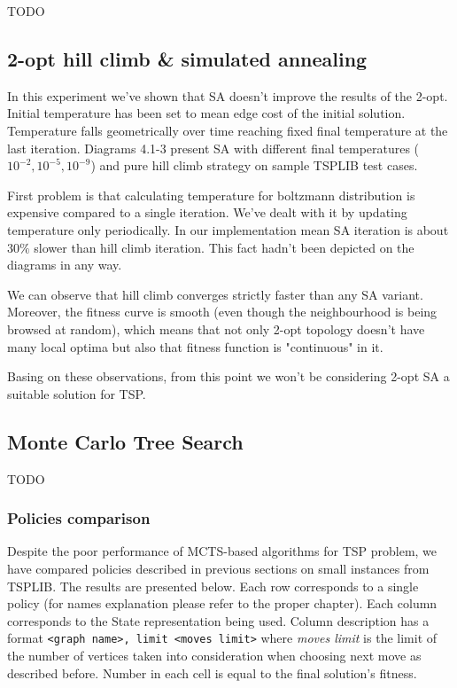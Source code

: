 TODO

\subsection { 2-opt hill climb \& simulated annealing }

In this experiment we've shown that SA doesn't improve the results of the 2-opt.
Initial temperature has been set to mean edge cost of the initial solution.
Temperature falls geometrically over time reaching fixed final temperature at the last iteration.
Diagrams 4.1-3 present SA with different final temperatures ($10^{-2}, 10^{-5}, 10^{-9}$) and
pure hill climb strategy on sample TSPLIB test cases.





First problem is that calculating temperature for boltzmann distribution is
expensive compared to a single iteration. We've dealt with it by updating temperature
only periodically. In our implementation mean SA iteration is about $30\%$ slower than
hill climb iteration. This fact hadn't been depicted on the diagrams in any way.

We can observe that hill climb converges strictly faster than any SA variant.
Moreover, the fitness curve is smooth (even though the neighbourhood is being browsed at random),
which means that not only 2-opt topology doesn't have many local optima but also that fitness function
is "continuous" in it.

Basing on these observations, from this point we won't be considering 2-opt SA a
suitable solution for TSP.

\subsection{Monte Carlo Tree Search}

TODO %

\subsubsection{Policies comparison}

Despite the poor performance of MCTS-based algorithms for TSP problem, we have
compared policies described in previous sections on small instances from
TSPLIB. The results are presented below. Each row corresponds to a single
policy (for names explanation please refer to the proper chapter). Each column
corresponds to the State representation being used. Column description has a
format \verb+<graph name>, limit <moves limit>+ where \emph{moves limit} is
the limit of the number of vertices taken into consideration when choosing next
move as described before. Number in each cell is equal to the final solution's
fitness.

